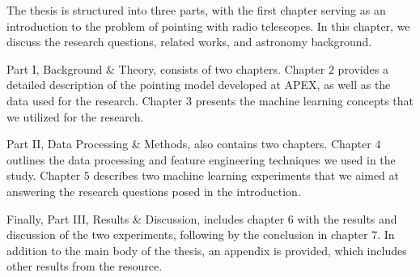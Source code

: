 The thesis is structured into three parts, with the first chapter serving as an introduction to the problem of pointing with radio telescopes.
In this chapter, we discuss the research questions, related works, and astronomy background.

Part I, Background \& Theory, consists of two chapters.
Chapter $2$ provides a detailed description of the pointing model developed at APEX, as well as the data used for the research.
Chapter $3$ presents the machine learning concepts that we utilized for the research.

Part II, Data Processing \& Methods, also contains two chapters.
Chapter $4$ outlines the data processing and feature engineering techniques we used in the study.
Chapter $5$ describes two machine learning experiments that we aimed at answering the research questions posed in the introduction.

Finally, Part III, Results \& Discussion, includes chapter $6$ with the results and discussion of the two experiments, following by the conclusion in chapter $7$.
In addition to the main body of the thesis, an appendix is provided, which includes other results from the resource.